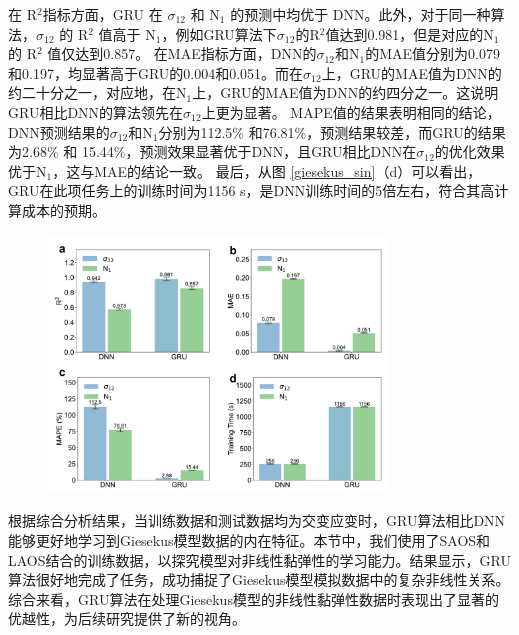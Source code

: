 在 R$^2$指标方面，GRU 在 $\sigma_{12}$ 和 N$_{1}$ 的预测中均优于 DNN。此外，对于同一种算法，$\sigma_{12}$ 的 R$^2$ 值高于 N$_{1}$，例如GRU算法下$\sigma_{12}$的R$^2$值达到0.981，但是对应的N$_{1}$ 的 R$^2$ 值仅达到0.857。
在MAE指标方面，DNN的$\sigma_{12}$和N$_{1}$的MAE值分别为0.079和0.197，均显著高于GRU的0.004和0.051。而在$\sigma_{12}$上，GRU的MAE值为DNN的约二十分之一，对应地，在N$_1$上，GRU的MAE值为DNN的约四分之一。这说明GRU相比DNN的算法领先在$\sigma_{12}$上更为显著。
MAPE值的结果表明相同的结论，DNN预测结果的$\sigma_{12}$和N$_1$分别为112.5\% 和76.81\%，预测结果较差，而GRU的结果为2.68\% 和 15.44\%，预测效果显著优于DNN，且GRU相比DNN在$\sigma_{12}$的优化效果优于N$_1$，这与MAE的结论一致。
最后，从图 \ref{giesekus_sin}（d）可以看出，GRU在此项任务上的训练时间为1156 s，是DNN训练时间的5倍左右，符合其高计算成本的预期。
\begin{figure}[htbp]
  \centering
  \includegraphics[width=0.8\textwidth]{Fig/giesekus-sin-metrics.pdf}
\end{figure}
根据综合分析结果，当训练数据和测试数据均为交变应变时，GRU算法相比DNN能够更好地学习到Giesekus模型数据的内在特征。本节中，我们使用了SAOS和LAOS结合的训练数据，以探究模型对非线性黏弹性的学习能力。结果显示，GRU算法很好地完成了任务，成功捕捉了Giesekus模型模拟数据中的复杂非线性关系。综合来看，GRU算法在处理Giesekus模型的非线性黏弹性数据时表现出了显著的优越性，为后续研究提供了新的视角。

